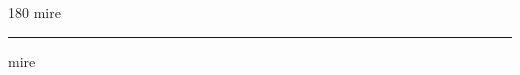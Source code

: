 
\begin{frame}
\begin{center}
\begin{turn}{180}
{\fontsize{2.5cm}{1em}\selectfont mire}
\end{turn}
\vspace{1em}\par  
\hrule
\vspace{1em}\par  
{\fontsize{2.5cm}{1em}\selectfont mire}
\end{center}
\end{frame}
